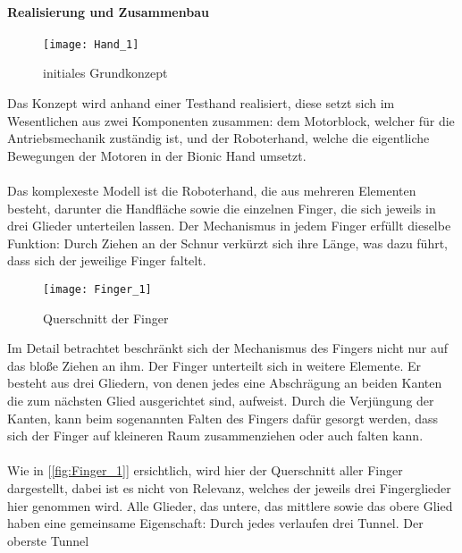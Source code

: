 \documentclass[titlepage,12pt,twoside]{article}
\begin{document}
\paragraph{Realisierung und Zusammenbau}
\label{par:Realisierung und Zusammenbau}
\hfill \break
\hfill \break
\begin{figure}[H]
	\begin{center}
		\scalebox{0.8}
		{\texttt{[image: Hand\_1]}}
		\caption{initiales Grundkonzept}
		\label{fig:Hand_1}		
	\end{center}
\end{figure}
\hfill \break
Das Konzept wird anhand einer Testhand realisiert, diese setzt sich im Wesentlichen 
aus zwei Komponenten zusammen: dem Motorblock, welcher für die Antriebsmechanik 
zuständig ist, und der Roboterhand, welche die eigentliche Bewegungen der Motoren 
in der Bionic Hand umsetzt. \\
\\
Das komplexeste Modell ist die Roboterhand, die aus mehreren Elementen besteht, 
darunter die Handfläche sowie die einzelnen Finger, die sich jeweils in drei Glieder 
unterteilen lassen. Der Mechanismus in jedem Finger erfüllt dieselbe Funktion: Durch 
Ziehen an der Schnur verkürzt sich ihre Länge, was dazu führt, dass sich der 
jeweilige Finger faltelt. \\
\begin{figure}[H]
	\begin{center}
		\scalebox{0.8}
		{\texttt{[image: Finger\_1]}}
		\caption{Querschnitt der Finger}
		\label{fig:Finger_1}		
	\end{center}
\end{figure}
\hfill \break
Im Detail betrachtet beschränkt sich der Mechanismus 
des Fingers nicht nur auf das bloße Ziehen an ihm. Der Finger unterteilt sich in weitere 
Elemente. Er besteht aus drei Gliedern, von denen jedes eine Abschrägung an beiden 
Kanten die zum nächsten Glied ausgerichtet sind, aufweist. Durch die Verjüngung der 
Kanten, kann beim sogenannten Falten des Fingers dafür gesorgt werden, dass sich der 
Finger auf kleineren Raum zusammenziehen oder auch falten kann. \\
\\
Wie in [\textcolor{blue}{\autoref{fig:Finger_1}}] ersichtlich, wird hier der Querschnitt aller Finger dargestellt, 
dabei ist es nicht von Relevanz, welches der jeweils drei Fingerglieder hier genommen wird. 
Alle Glieder, das untere, das mittlere sowie das obere Glied haben eine 
gemeinsame Eigenschaft: Durch jedes verlaufen drei Tunnel. Der oberste Tunnel 
\end{document}
